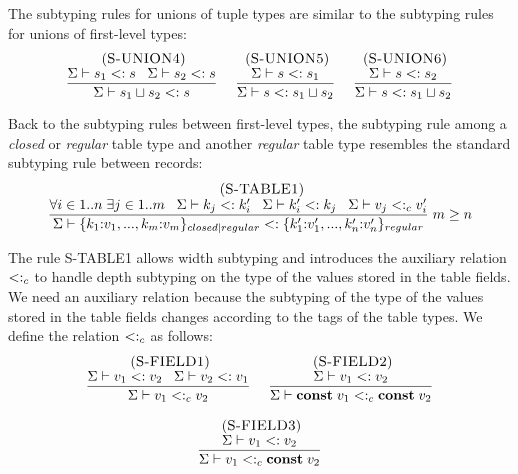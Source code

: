 The subtyping rules for unions of tuple types are similar to the
subtyping rules for unions of first-level types:
\[
\begin{array}{c}
\begin{array}{c}
\; (\textsc{S-UNION4})\\
\dfrac{\Sigma \vdash s_{1} <: s \;\;\;
       \Sigma \vdash s_{2} <: s}
      {\Sigma \vdash s_{1} \sqcup s_{2} <: s}
\end{array}
\;
\begin{array}{c}
\; (\textsc{S-UNION5})\\
\dfrac{\Sigma \vdash s <: s_{1}}
      {\Sigma \vdash s <: s_{1} \sqcup s_{2}}
\end{array}
\;
\begin{array}{c}
\; (\textsc{S-UNION6})\\
\dfrac{\Sigma \vdash s <: s_{2}}
      {\Sigma \vdash s <: s_{1} \sqcup s_{2}}
\end{array}
\end{array}
\]

Back to the subtyping rules between first-level types,
the subtyping rule among a \emph{closed} or \emph{regular}
table type and another \emph{regular} table type resembles the
standard subtyping rule between records:
\[
\begin{array}{c}
\; (\textsc{S-TABLE1})\\
\dfrac{\forall i \in 1..n \; \exists j \in 1..m \;\;\;
       \Sigma \vdash k_{j} <: k_{i}' \;\;\;
       \Sigma \vdash k_{i}' <: k_{j} \;\;\;
       \Sigma \vdash v_{j} <:_{c} v_{i}'}
      {\Sigma \vdash \{k_{1}{:}v_{1}, ..., k_{m}{:}v_{m}\}_{closed|regular} <: \{k_{1}'{:}v_{1}', ..., k_{n}'{:}v_{n}'\}_{regular}} \; m \ge n
\end{array}
\]

The rule \textsc{S-TABLE1} allows width subtyping and introduces the
auxiliary relation $<:_{c}$ to handle depth subtyping on the
type of the values stored in the table fields.
We need an auxiliary relation because the subtyping of the
type of the values stored in the table fields changes according to
the tags of the table types.
We define the relation $<:_{c}$ as follows:
\[
\begin{array}{c}
\begin{array}{c}
\; (\textsc{S-FIELD1})\\
\dfrac{\Sigma \vdash v_{1} <: v_{2} \;\;\;
       \Sigma \vdash v_{2} <: v_{1}}
      {\Sigma \vdash v_{1} <:_{c} v_{2}}
\end{array}
\;
\begin{array}{c}
\; (\textsc{S-FIELD2})\\
\dfrac{\Sigma \vdash v_{1} <: v_{2}}
      {\Sigma \vdash \mathbf{const} \; v_{1} <:_{c} \mathbf{const} \; v_{2}}
\end{array}
\\ \\
\begin{array}{c}
\; (\textsc{S-FIELD3})\\
\dfrac{\Sigma \vdash v_{1} <: v_{2}}
      {\Sigma \vdash v_{1} <:_{c} \mathbf{const} \; v_{2}}
\end{array}
\end{array}
\]

